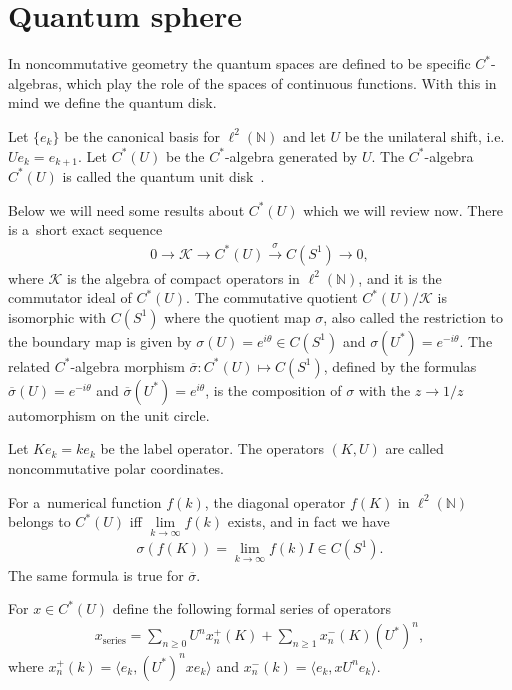 \section{Quantum sphere}\label{Section3}

In noncommutative geometry the quantum spaces are def\/ined to be specif\/ic $C^*$-algebras, which play the role of the
spaces of continuous functions.
With this in mind we def\/ine the quantum disk.

\begin{defin}
Let $\{e_k\}$ be the canonical basis for $\ell^2({\mathbb N})$ and let $U$ be the unilateral shift, i.e.
$Ue_k = e_{k+1}$.
Let $C^*(U)$ be the $C^*$-algebra generated by $U$.
The $C^*$-algebra $C^*(U)$ is called the quantum unit disk~\cite{KL}.
\end{defin}

Below we will need some results about $C^*(U)$ which we will review now.
There is a~short exact sequence
\begin{gather*}
0\longrightarrow \mathcal{K} \longrightarrow C^*(U) \overset{\sigma}{\longrightarrow} C(S^1) \longrightarrow 0,
\end{gather*}
where $ \mathcal{K} $ is the algebra of compact operators in $\ell^2({\mathbb N})$, and it is the commutator ideal of
$C^*(U)$.
The commutative quotient $C^*(U)/\mathcal{K}$ is isomorphic with $C(S^1)$ where the quotient map $\sigma$, also called
the restriction to the boundary map is given by $\sigma(U)= e^{i\theta}\in C(S^1) $ and $\sigma(U^*)=e^{-i\theta}$.
The related $C^*$-algebra morphism $\overline{\sigma}:C^*(U)\mapsto C(S^1)$, def\/ined by the formulas
$\overline{\sigma}(U)=e^{-i\theta}$ and $\overline{\sigma}(U^*) = e^{i\theta}$, is the composition of $\sigma$ with the
$z\to 1/z$ automorphism on the unit circle.

Let $Ke_k = ke_k$ be the label operator.
The operators $(K,U)$ are called noncommutative polar coordinates.

For a~numerical function $f(k)$, the diagonal operator $f(K)$ in $\ell^2({\mathbb N})$ belongs to $C^*(U)$ if\/f
$\lim\limits_{k\to\infty}f(k)$ exists, and in fact we have
\begin{gather*}
\sigma(f(K))=\lim_{k\to\infty}f(k)I\in C(S^1).
\end{gather*}
The same formula is true for $\overline{\sigma}$.

For $x\in C^*(U)$ def\/ine the following formal series of operators
\begin{gather*}
x_\textrm{series} = \sum\limits_{n\ge0} U^n x_n^+(K) + \sum\limits_{n\ge1} x_n^-(K)(U^*)^n,
\end{gather*}
where $x_n^+(k) = \langle e_k, (U^*)^nx e_k\rangle$ and $x_n^-(k) = \langle e_k, xU^n e_k\rangle$.

